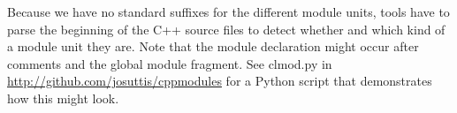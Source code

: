 Because we have no standard suffixes for the different module units, tools have to parse the beginning of the C++ source files to detect whether and which kind of a module unit they are. Note that the module declaration might occur after comments and the global module fragment. See clmod.py in \url{http://github.com/josuttis/cppmodules} for a Python script that demonstrates how this might look.






